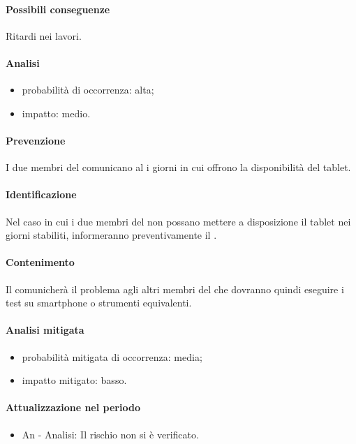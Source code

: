 					\paragraph{Possibili conseguenze} Ritardi nei lavori.
					\paragraph{Analisi}
					\begin{itemize}
					\item{probabilità di occorrenza:} alta;
					\item{impatto:} medio.
					\end{itemize}
					\paragraph{Prevenzione} I due membri del  comunicano al \responsabilediprogetto{} i giorni in cui offrono la disponibilità del tablet.
					\paragraph{Identificazione}
					Nel caso in cui i due membri del  non possano mettere a disposizione il tablet nei giorni stabiliti, informeranno preventivamente il \responsabilediprogetto{}.
					\paragraph{Contenimento}
					Il \responsabilediprogetto{} comunicherà il problema agli altri membri del  che dovranno quindi eseguire i test su smartphone o strumenti equivalenti.
			\paragraph{Analisi mitigata}
			\begin{itemize}
			\item{probabilità mitigata di occorrenza:} media;
			\item{impatto mitigato:} basso.
			\end{itemize}
					\paragraph{Attualizzazione nel periodo}
						\begin{itemize}
						\item{An - Analisi}: Il rischio non si è verificato.
						\end{itemize}

